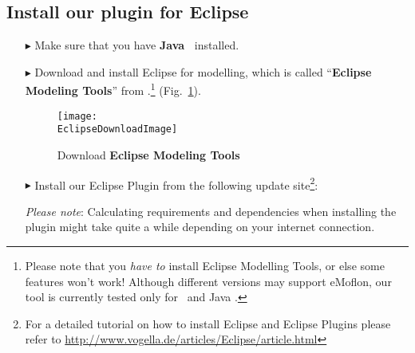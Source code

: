 \newpage
\genHeader
\hypertarget{installPlugin common}{} 
\subsection{Install our plugin for Eclipse}
 
\vspace{0.5cm}
 
\begin{itemize}

\item[$\blacktriangleright$] Make sure that you have \textbf{Java~\JavaVersion{}} installed.
 
\item[$\blacktriangleright$] Download and install Eclipse \EclipseVersion for modelling, which is called ``\textbf{Eclipse Modeling Tools}'' from \EclipseDownloadLink.\footnote{Please
note that you \emph{have to} install Eclipse Modelling Tools, or else some features won't work! Although different versions may support eMoflon, our tool is
currently tested only for \EclipseVersion~and Java \JavaVersion.} (Fig.~\ref{eclipseDownload}).

\begin{figure}[htbp]
	\centering
  	\texttt{[image: \\EclipseDownloadImage]}
	\caption{Download \textbf{Eclipse Modeling Tools}}
	\label{eclipseDownload}
\end{figure}

\vspace{0.5cm}

\item[$\blacktriangleright$] Install our Eclipse Plugin from the following update site\footnote{For a detailed tutorial on how to install Eclipse and Eclipse
Plugins please refer to \url{http://www.vogella.de/articles/Eclipse/article.html}}: \eMoflonUpdateSite

\emph{Please note}: Calculating requirements and dependencies when
installing the plugin might take quite a while depending on your internet connection.


\end{itemize}
